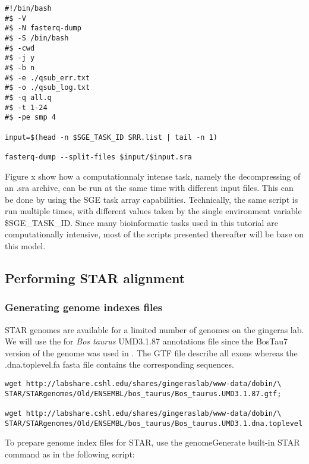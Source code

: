 \begin{verbatim}
#!/bin/bash
#$ -V
#$ -N fasterq-dump
#$ -S /bin/bash
#$ -cwd
#$ -j y
#$ -b n
#$ -e ./qsub_err.txt
#$ -o ./qsub_log.txt
#$ -q all.q
#$ -t 1-24
#$ -pe smp 4

input=$(head -n $SGE_TASK_ID SRR.list | tail -n 1)

fasterq-dump --split-files $input/$input.sra
\end{verbatim}


Figure x show how a computationnaly intense task, namely the decompressing of an .sra archive, can be run at the same time with different input files. This can be done by using the SGE task array capabilities. Technically, the same script is run multiple times, with different values taken by the single environment variable \$SGE\_TASK\_ID. Since many bioinformatic tasks used in this tutorial are computationally intensive, most of the scripts presented thereafter will be base on this model.







 

\subsection{Performing STAR alignment}

\subsubsection{Generating genome indexes files}

STAR genomes are available for a limited number of genomes on the gingeras lab. We will use the for \textit{Bos taurus}  UMD3.1.87 annotations file since the BosTau7 version of the genome was used in \cite{Ariel2021}. The GTF file describe all exons whereas the .dna.toplevel.fa fasta file contains the corresponding sequences.



\begin{verbatim}
wget http://labshare.cshl.edu/shares/gingeraslab/www-data/dobin/\
STAR/STARgenomes/Old/ENSEMBL/bos_taurus/Bos_taurus.UMD3.1.87.gtf;

wget http://labshare.cshl.edu/shares/gingeraslab/www-data/dobin/\
STAR/STARgenomes/Old/ENSEMBL/bos_taurus/Bos_taurus.UMD3.1.dna.toplevel.fa;
\end{verbatim}

To prepare genome index files for STAR, use the genomeGenerate built-in STAR command as in the following script:


